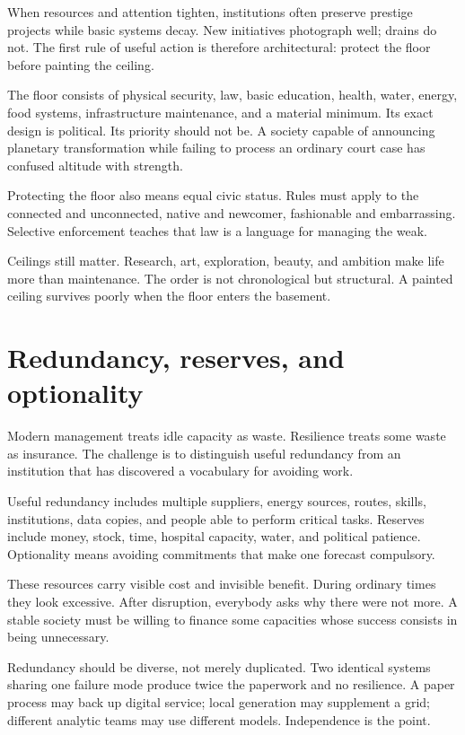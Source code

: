 \documentclass[12pt,a4paper]{book}
\begin{document}
When resources and attention tighten, institutions often preserve prestige
projects while basic systems decay.  New initiatives photograph well; drains
do not.  The first rule of useful action is therefore architectural: protect
the floor before painting the ceiling.

The floor consists of physical security, law, basic education, health, water,
energy, food systems, infrastructure maintenance, and a material minimum.  Its
exact design is political.  Its priority should not be.  A society capable of
announcing planetary transformation while failing to process an ordinary court
case has confused altitude with strength.

Protecting the floor also means equal civic status.  Rules must apply to the
connected and unconnected, native and newcomer, fashionable and embarrassing.
Selective enforcement teaches that law is a language for managing the weak.

Ceilings still matter.  Research, art, exploration, beauty, and ambition make
life more than maintenance.  The order is not chronological but structural.
A painted ceiling survives poorly when the floor enters the basement.

\section{Redundancy, reserves, and optionality}

Modern management treats idle capacity as waste.  Resilience treats some waste
as insurance.  The challenge is to distinguish useful redundancy from an
institution that has discovered a vocabulary for avoiding work.

Useful redundancy includes multiple suppliers, energy sources, routes, skills,
institutions, data copies, and people able to perform critical tasks.  Reserves
include money, stock, time, hospital capacity, water, and political patience.
Optionality means avoiding commitments that make one forecast compulsory.

These resources carry visible cost and invisible benefit.  During ordinary
times they look excessive.  After disruption, everybody asks why there were
not more.  A stable society must be willing to finance some capacities whose
success consists in being unnecessary.

Redundancy should be diverse, not merely duplicated.  Two identical systems
sharing one failure mode produce twice the paperwork and no resilience.  A
paper process may back up digital service; local generation may supplement a
grid; different analytic teams may use different models.  Independence is the
point.
\end{document}
